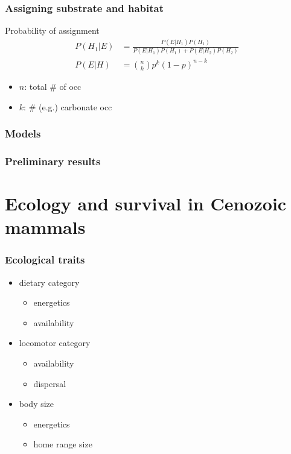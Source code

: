 \documentclass{beamer} \usepackage{amsmath,amsthm}
\begin{document}
\begin{frame}
  \frametitle{Assigning substrate and habitat}

  \begin{block}{Probability of assignment}
    \begin{align*}
      P(H_{1}|E) &= \frac{P(E|H_{1})P(H_{1})}{P(E|H_{1})P(H_{1}) + P(E|H_{2})P(H_{2})} \\
      P(E|H) &= \binom{n}{k} p^{k}(1 - p)^{n - k}
    \end{align*}

    \begin{itemize}
      \item \(n\): total \# of occ
      \item \(k\): \# (e.g.) carbonate occ
    \end{itemize}

    \tiny{}
  \end{block}
\end{frame}

\begin{frame}
  \frametitle{Models}
\end{frame}

\begin{frame}
  \frametitle{Preliminary results}
\end{frame}


\section{Ecology and survival in Cenozoic mammals}

\begin{frame}
  \frametitle{Ecological traits}

  \begin{itemize}
    \item dietary category
      \begin{itemize}
        \item energetics
        \item availability
      \end{itemize}
    \item locomotor category
      \begin{itemize}
        \item availability
        \item dispersal
      \end{itemize}
    \item body size
      \begin{itemize}
        \item energetics
        \item home range size
      \end{itemize}
  \end{itemize}
\end{frame}
\end{document}
